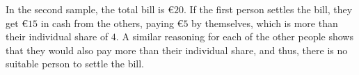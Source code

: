 In the second sample, the total bill is €$20$.
If the first person settles the bill, they get €$15$ in cash from the
others, paying €$5$ by themselves, which is more than their individual share of $4$.
A similar reasoning for each of the other people shows that they would also pay
more than their individual share, and thus, there is no suitable person to settle the bill.
